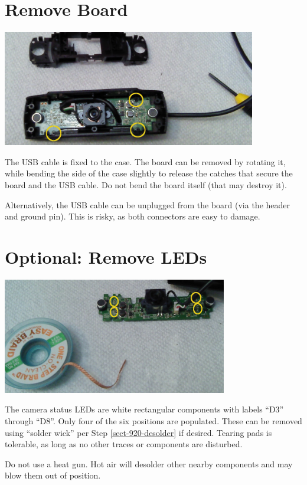 \section{Remove Board}

\includegraphics[height=2in]{pics-c920/06-boardscrews.jpg}

The USB cable is fixed to the case. The board can be removed by rotating it,
while bending the side of the case slightly to release the catches that secure
the board and the USB cable. Do not bend the board itself (that may destroy
it).

Alternatively, the USB cable can be unplugged from the board (via the header
and ground pin). This is risky, as both connectors are easy to damage.

\section{Optional: Remove LEDs}

\includegraphics[height=2in]{pics-c920/06b-leds.jpg}

The camera status LEDs are white rectangular components with labels ``D3''
through ``D8''. Only four of the six positions are populated. These can be
removed using ``solder wick'' per Step \ref{sect-920-desolder} if desired.
Tearing pads is tolerable, as long as no other traces or components are
disturbed.

Do not use a heat gun. Hot air will desolder other nearby components and may
blow them out of position.

